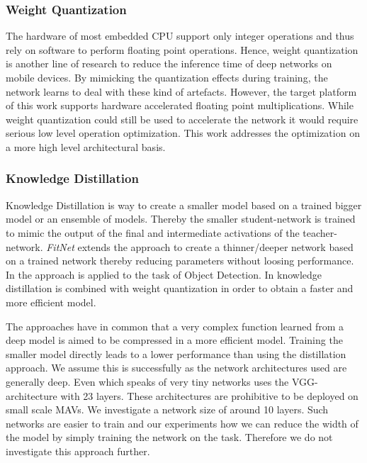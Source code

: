 \subsubsection{Weight Quantization}

The hardware of most embedded \ac{CPU} support only integer operations and thus rely on software to perform floating point operations. Hence, weight quantization is another line of research to reduce the inference time of deep networks on mobile devices. By mimicking the quantization effects during training, the network learns to deal with these kind of artefacts. However, the target platform of this work supports hardware accelerated floating point multiplications. While weight quantization could still be used to accelerate the network it would require serious low level operation optimization. This work addresses the optimization on a more high level architectural basis.

\subsubsection{Knowledge Distillation}

Knowledge Distillation \cite{Hinton2006} is way to create a smaller model based on a trained bigger model or an ensemble of models. Thereby the smaller student-network is trained to mimic the output of the final and intermediate activations of the teacher-network. \textit{FitNet} extends the approach to create a thinner/deeper network based on a trained network thereby reducing parameters without loosing performance. In \cite{Li2017c} the approach is applied to the task of Object Detection. In \cite{Wei2018a} knowledge distillation is combined with weight quantization in order to obtain a faster and more efficient model.

The approaches have in common that a very complex function learned from a deep model is aimed to be compressed in a more efficient model. Training the smaller model directly leads to a lower performance than using the distillation approach. We assume this is successfully as the network architectures used are generally deep. Even \cite{Wei2018a} which speaks of very tiny networks uses the VGG-architecture with 23 layers. These architectures are prohibitive to be deployed on small scale \acp{MAV}. We investigate a network size of around 10 layers. Such networks are easier to train and our experiments how we can reduce the width of the model by simply training the network on the task. Therefore we do not investigate this approach further.

